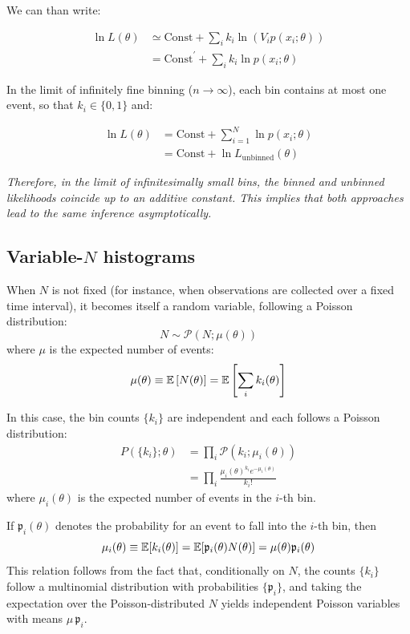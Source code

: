 We can than write:

\begin{align*}
	\ln L (\theta) &\simeq \text{Const} + \sum_i k_i \ln (V_i p(x_i;\theta)) \\
	&= \text{Const}^\prime + \sum_i k_i \ln p(x_i;\theta)
\end{align*}

In the limit of infinitely fine binning ($n \to \infty$), each bin contains at most one event, so that $k_i \in \{0,1\}$ and:

\begin{align*}
	\ln L(\theta) &= \text{Const} + \sum_{i=1}^{N}\ln p(x_i;\theta)\\
	&= \text{Const} + \ln L_{\text{unbinned}}(\theta) 
\end{align*}

\emph{Therefore, in the limit of infinitesimally small bins, the binned and unbinned likelihoods coincide up to an additive constant. This implies that both approaches lead to the same inference asymptotically.}

\subsection{Variable-$N$ histograms}

When $N$ is not fixed (for instance, when observations are collected over a fixed time interval), it becomes itself a random variable, following a Poisson distribution:
\[
	N \sim \mathcal{P}(N; \mu(\theta))
\]
where $\mu$ is the expected number of events:
\[
	\mu(\theta)\equiv\mathbb{E}\left[N(\theta)\right]=\mathbb{E}\left[\sum_i k_i(\theta)\right]
\]

In this case, the bin counts $\{k_i\}$ are independent and each follows a Poisson distribution:
\begin{align*}
	P(\{k_i\};\theta)&=\prod_i\mathcal{P}(k_i;\mu_i(\theta))\\
	&=\prod_i \frac{\mu_i(\theta)^{k_i}e^{-\mu_i(\theta)}}{k_i!}
\end{align*}
where $\mu_i(\theta)$ is the expected number of events in the $i$-th bin.

If $\mathfrak{p}_i(\theta)$ denotes the probability for an event to fall into the $i$-th bin, then
\[
	\mu_i (\theta) \equiv \mathbb{E} [ k_i (\theta) ] = \mathbb{E} [\mathfrak{p}_i(\theta)N(\theta)] = \mu(\theta)\mathfrak{p}_i(\theta)
\]
This relation follows from the fact that, conditionally on $N$, the counts $\{k_i\}$ follow a multinomial distribution with probabilities $\{\mathfrak{p}_i\}$, and taking the expectation over the Poisson-distributed $N$ yields independent Poisson variables with means $\mu\,\mathfrak{p}_i$.

